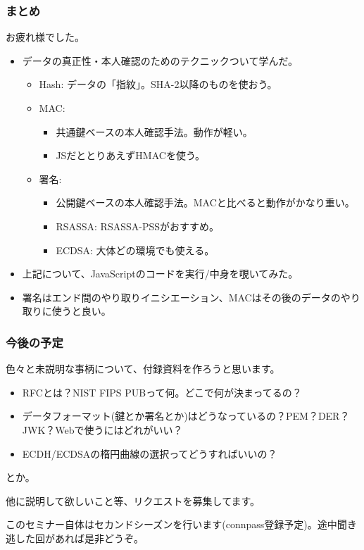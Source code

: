 \documentclass[12pt,dvipdfmx]{beamer}
\begin{document}
\begin{frame}
\frametitle{まとめ}
お疲れ様でした。

\begin{itemize}
\item データの真正性・本人確認のためのテクニックついて学んだ。
\begin{itemize}
 \item Hash: データの「指紋」。SHA-2以降のものを使おう。
 \item MAC:
\begin{itemize}
 \item 共通鍵ベースの本人確認手法。動作が軽い。
 \item JSだととりあえずHMACを使う。
\end{itemize}
 \item 署名:
\begin{itemize}
\item 公開鍵ベースの本人確認手法。MACと比べると動作がかなり重い。
\item RSASSA: \alert{RSASSA-PSSがおすすめ}。
\item ECDSA: 大体どの環境でも使える。
\end{itemize}
\end{itemize}
\item 上記について、JavaScriptのコードを実行/中身を覗いてみた。
\item 署名はエンド間のやり取りイニシエーション、MACはその後のデータのやり取りに使うと良い。
\end{itemize}
\end{frame}


\begin{frame}
\frametitle{今後の予定}
色々と未説明な事柄について、付録資料を作ろうと思います。
\begin{itemize}
 \item RFCとは？NIST FIPS PUBって何。どこで何が決まってるの？
 \item データフォーマット(鍵とか署名とか)はどうなっているの？PEM？DER？JWK？Webで使うにはどれがいい？
 \item ECDH/ECDSAの楕円曲線の選択ってどうすればいいの？
\end{itemize}
とか。

他に説明して欲しいこと等、リクエストを募集してます。


\vspace{2ex}

このセミナー自体はセカンドシーズンを行います(connpass登録予定)。途中聞き逃した回があれば是非どうぞ。

\end{frame}
\end{document}
